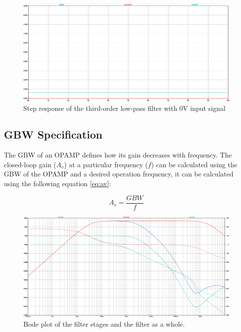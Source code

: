 \begin{figure}[H]
    \centering
    \includegraphics[width=1\linewidth]{images/step_vos2.png}
    \caption{Step response of the third-order low-pass filter with 0V input signal}
    \label{fig:step_vos2}
\end{figure}

\subsection{GBW Specification}
The GBW of an OPAMP defines how its gain decreases with frequency. The closed-loop gain ($A_{v}$) at a particular frequency ($f$) can be calculated using the GBW of the OPAMP and a desired operation frequency, it can be calculated using the following equation \ref{eq:av}:

\begin{equation}
    A_{v} = \frac{GBW}{f}
    \label{eq:av}
\end{equation}

\begin{figure}[H]
    \centering
    \includegraphics[width=1\linewidth]{images/bode-stages.png}
    \caption{Bode plot of the filter stages and the filter as a whole.}
    \label{fig:bode-stages}
\end{figure}

